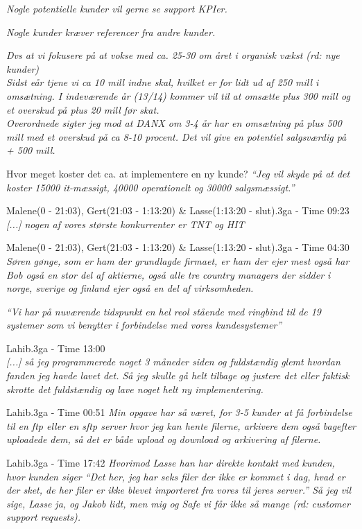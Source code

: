 \begin{thebibliography}{9}
	\textit{Nogle potentielle kunder vil gerne se support KPIer.}

	\textit{Nogle kunder kræver referencer fra andre kunder.}

	\textit{Dvs at vi fokusere på at vokse med ca. 25-30 om året i organisk vækst \emph{(rd: nye kunder)}}\\
\textit{Sidst eår tjene vi ca 10 mill indne skal, hvilket er for lidt ud af 250 mill i omsætning. I indeværende år (13/14) kommer vil til at omsætte plus 300 mill og et overskud på plus 20 mill før skat.}\\
\textit{Overordnede sigter jeg mod at DANX om 3-4 år har en omsætning på plus 500 mill med et overskud på ca 8-10 procent. Det vil give en potentiel salgsværdig på + 500 mill.}

	Hvor meget koster det ca. at implementere en ny kunde?
	\textit{“Jeg vil skyde på at det koster 15000 it-mæssigt, 40000 operationelt og 30000 salgsmæssigt.”}

	Malene(0 - 21:03), Gert(21:03 - 1:13:20) \& Lasse(1:13:20 - slut).3ga - Time 09:23\\
	\textit{[...] nogen af vores største konkurrenter er TNT og HIT}

	Malene(0 - 21:03), Gert(21:03 - 1:13:20) \& Lasse(1:13:20 - slut).3ga - Time 04:30
	\textit{Søren gønge, som er ham der grundlagde firmaet, er ham der ejer mest også har Bob også en stor del af aktierne, også alle tre country managers der sidder i norge, sverige og finland ejer også en del af virksomheden.}

	\textit{“Vi har på nuværende tidspunkt en hel reol stående med ringbind til de 19 systemer som vi benytter i forbindelse med vores kundesystemer”}

	Lahib.3ga - Time 13:00\\
	\textit{[...] så jeg programmerede noget 3 måneder siden og fuldstændig glemt hvordan fanden jeg havde lavet det. Så jeg skulle gå helt tilbage og justere det eller faktisk skrotte det fuldstændig og lave noget helt ny implementering.}

	Lahib.3ga - Time 00:51
	\textit{Min opgave har så været, for 3-5 kunder at få forbindelse til en ftp eller en sftp server hvor jeg kan hente filerne, arkivere dem også bagefter uploadede dem, så det er både upload og download og arkivering af filerne.}

	Lahib.3ga - Time 17:42
	\textit{Hvorimod Lasse han har direkte kontakt med kunden, hvor kunden siger “Det her, jeg har seks filer der ikke er kommet i dag, hvad er der sket, de her filer er ikke blevet importeret fra vores til jeres server.” Så jeg vil sige, Lasse ja, og Jakob lidt, men mig og Safe vi får ikke så mange \emph{(rd: customer support requests)}.}


\end{thebibliography}
